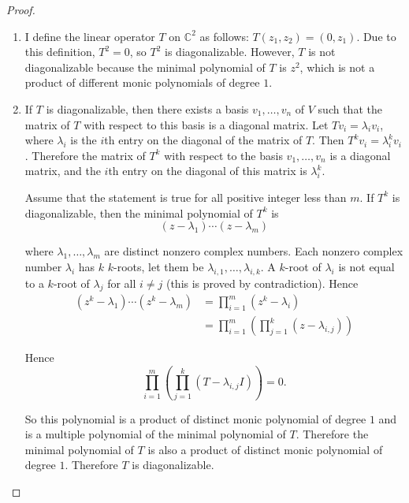 \begin{proof}
    \begin{enumerate}[label={(\alph*)}]
        \item I define the linear operator $T$ on $\mathbb{C}^{2}$ as follows: $T(z_{1}, z_{2}) = (0, z_{1})$. Due to this definition, $T^{2} = 0$, so $T^{2}$ is diagonalizable. However, $T$ is not diagonalizable because the minimal polynomial of $T$ is $z^{2}$, which is not a product of different monic polynomials of degree $1$.
        \item If $T$ is diagonalizable, then there exists a basis $v_{1}, \ldots, v_{n}$ of $V$ such that the matrix of $T$ with respect to this basis is a diagonal matrix. Let $Tv_{i} = \lambda_{i}v_{i}$, where $\lambda_{i}$ is the $i$th entry on the diagonal of the matrix of $T$. Then $T^{k}v_{i} = \lambda_{i}^{k}v_{i}$. Therefore the matrix of $T^{k}$ with respect to the basis $v_{1}, \ldots, v_{n}$ is a diagonal matrix, and the $i$th entry on the diagonal of this matrix is $\lambda_{i}^{k}$.

              Assume that the statement is true for all positive integer less than $m$. If $T^{k}$ is diagonalizable, then the minimal polynomial of $T^{k}$ is
              \[
                  (z - \lambda_{1})\cdots (z - \lambda_{m})
              \]

              where $\lambda_{1}, \ldots, \lambda_{m}$ are distinct nonzero complex numbers. Each nonzero complex number $\lambda_{i}$ has $k$ $k$-roots, let them be $\lambda_{i,1}, \ldots, \lambda_{i,k}$. A $k$-root of $\lambda_{i}$ is not equal to a $k$-root of $\lambda_{j}$ for all $i\ne j$ (this is proved by contradiction). Hence
              \begin{align*}
                  (z^{k} - \lambda_{1})\cdots (z^{k} - \lambda_{m}) & = \prod^{m}_{i=1}(z^{k} - \lambda_{i})                           \\
                                                                    & = \prod^{m}_{i=1}\left(\prod^{k}_{j=1}(z - \lambda_{i,j})\right)
              \end{align*}

              Hence
              \[
                  \prod^{m}_{i=1}\left(\prod^{k}_{j=1}(T - \lambda_{i,j}I)\right) = 0.
              \]

              So this polynomial is a product of distinct monic polynomial of degree $1$ and is a multiple polynomial of the minimal polynomial of $T$. Therefore the minimal polynomial of $T$ is also a product of distinct monic polynomial of degree $1$. Therefore $T$ is diagonalizable.
    \end{enumerate}
\end{proof}
\newpage

